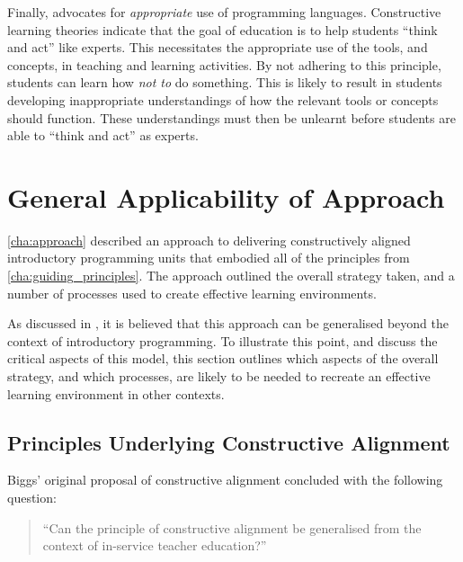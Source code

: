 Finally,  advocates for \emph{appropriate} use of programming languages. Constructive learning theories indicate that the goal of education is to help students ``think and act'' like experts. This necessitates the appropriate use of the tools, and concepts, in teaching and learning activities. By not adhering to this principle, students can learn how \emph{not to} do something. This is likely to result in students developing inappropriate understandings of how the relevant tools or concepts should function. These understandings must then be unlearnt before students are able to ``think and act'' as experts.


\section{General Applicability of Approach} %
\label{sec:approach_in_review}

\cref{cha:approach} described an approach to delivering constructively aligned introductory programming units that embodied all of the principles from \cref{cha:guiding_principles}. The approach outlined the overall strategy taken, and a number of processes used to create effective learning environments. 

As discussed in , it is believed that this approach can be generalised beyond the context of introductory programming. To illustrate this point, and discuss the critical aspects of this model, this section outlines which aspects of the overall strategy, and which processes, are likely to be needed to recreate an effective learning environment in other contexts.

\subsection{Principles Underlying Constructive Alignment} %
\label{sub:principles_underlying_constructive_alignment}

Biggs' original proposal of constructive alignment concluded with the following question:

\begin{quote}
	``Can the principle of constructive alignment be generalised from the context of in-service teacher education?'' \citet{Biggs:1996c}
\end{quote}

